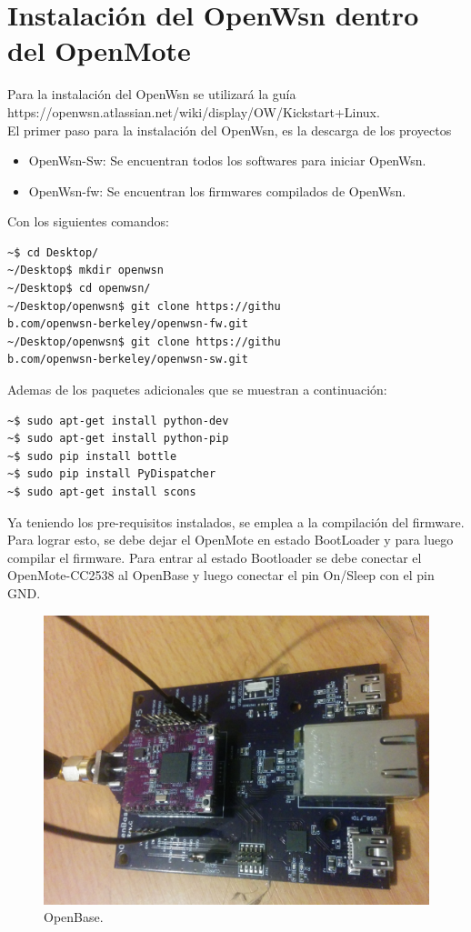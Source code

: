 \documentclass[journal]{IEEEtran}
\begin{document}
\section{Instalación del OpenWsn dentro del OpenMote}
Para la instalación del OpenWsn se utilizará la guía https://openwsn.atlassian.net/wiki/display/OW/Kickstart+Linux.
\\
El primer paso para la instalación del OpenWsn, es la descarga de los proyectos
\begin{itemize}
        \item OpenWsn-Sw: Se encuentran todos los softwares para iniciar OpenWsn.
        \item OpenWsn-fw: Se encuentran los firmwares compilados de OpenWsn.
\end{itemize}
Con los siguientes comandos:
\begin{lstlisting}[frame=single]
~$ cd Desktop/
~/Desktop$ mkdir openwsn
~/Desktop$ cd openwsn/
~/Desktop/openwsn$ git clone https://githu
b.com/openwsn-berkeley/openwsn-fw.git
~/Desktop/openwsn$ git clone https://githu
b.com/openwsn-berkeley/openwsn-sw.git   
\end{lstlisting}
Ademas de los paquetes adicionales que se muestran a continuación:
\begin{lstlisting}[frame=single]
~$ sudo apt-get install python-dev      
~$ sudo apt-get install python-pip
~$ sudo pip install bottle
~$ sudo pip install PyDispatcher
~$ sudo apt-get install scons
\end{lstlisting}
\newpage
Ya teniendo los pre-requisitos instalados, se emplea a la compilación del firmware. Para lograr esto, se debe dejar el OpenMote en estado BootLoader y para luego compilar el firmware. Para entrar al estado Bootloader se debe conectar el OpenMote-CC2538 al OpenBase y luego conectar el pin On/Sleep con el pin GND. 
\begin{figure}[!h]
	\begin{center}
		\includegraphics[scale=0.05]{bootloader.jpg}
	\end{center}			            
	\caption{OpenBase.}        
\end{figure}
\end{document}
